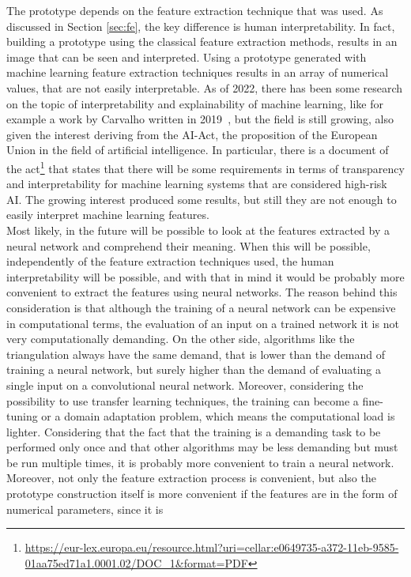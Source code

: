 \documentclass[conference]{IEEEtran}
\begin{document}
			\noindent The prototype depends on the feature extraction technique that was used. As discussed in Section \ref{sec:fe}, the key difference is human interpretability. In fact, building a prototype using the 
			classical feature extraction methods, results in an image that can be seen and interpreted. Using a prototype generated with machine learning feature extraction techniques results in an array 
			of numerical values, that are not easily interpretable. As of 2022, there has been some research on the topic of interpretability and explainability of machine learning, like for example 
			a work by Carvalho written in 2019~\cite{electronics8080832}, 
			but the field is still growing, also given the interest deriving from the AI-Act, the proposition of the European Union in the field of artificial intelligence. In particular, there is a document of 
			the act\footnote{\url{https://eur-lex.europa.eu/resource.html?uri=cellar:e0649735-a372-11eb-9585-01aa75ed71a1.0001.02/DOC_1&format=PDF}} that states that there will be some requirements in terms of 
			transparency and interpretability for machine learning systems that are considered high-risk AI. The growing interest produced some results, but still they are not enough to easily interpret machine learning 
			features.\\
			Most likely, in the future will be possible to look at the features extracted by a neural network and comprehend their meaning. When this will be possible, independently of the feature extraction techniques 
			used, the human interpretability will be possible, and with that in mind it would be probably more convenient to extract the features using neural networks. The reason behind this consideration is 
			that although the training of a neural network can be expensive in computational terms, the evaluation of an input on a trained network it is not very computationally demanding. On the other side, algorithms 
			like the triangulation always have the same demand, that is lower than the demand of training a neural network, but surely higher than the demand of evaluating a single input on a convolutional neural network. 
			Moreover, considering the possibility to use transfer learning techniques, the training can become a fine-tuning or a domain adaptation problem, which means the computational load is lighter. Considering that 
			the fact that the training is a demanding task to be performed only once and that other algorithms may be less demanding but must be run multiple times, it is probably more convenient to train a neural 
			network. Moreover, not only the feature extraction process is convenient, but also the prototype construction itself is more convenient if the features are in the form of numerical parameters, since it is 
\end{document}
